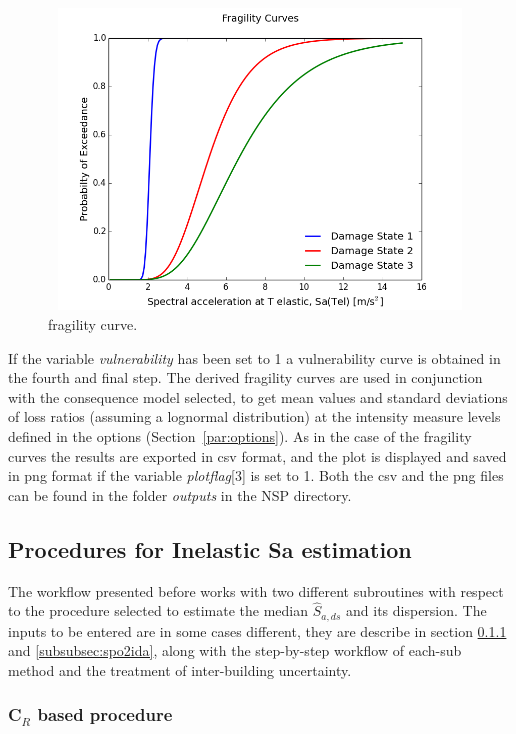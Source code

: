 \begin{figure}[H]
\centering
\includegraphics[width=12cm,height=8cm]{./figures/fragility.png}
\caption{fragility curve.}
\label{fig:fragility}
\end{figure}

If the variable \textit{vulnerability} has been set to 1 a vulnerability curve is obtained in the fourth and final step. The derived fragility curves are used in conjunction with the consequence model selected, to get mean values and standard deviations of loss ratios (assuming a lognormal distribution) at the intensity measure levels defined in the options (Section~\ref{par:options}).
As in the case of the fragility curves the results are exported in csv format, and the plot is displayed and saved in png format if the variable \textit{plotflag}[3] is set to 1. Both the csv and the png files can be found in the folder \textit{outputs} in the NSP directory.

\subsection{Procedures for Inelastic Sa estimation}
The workflow presented before works with two different subroutines with respect to the procedure selected to estimate the median $\hat{S}_{a,ds}$ and its dispersion. The inputs to be entered are in some cases different, they are describe in section \ref{subsubsec:CR} and \ref{subsubsec:spo2ida}, along with the step-by-step workflow of each-sub method and the treatment of inter-building uncertainty.

\subsubsection{C$_R$ based procedure}
\label{subsubsec:CR}

